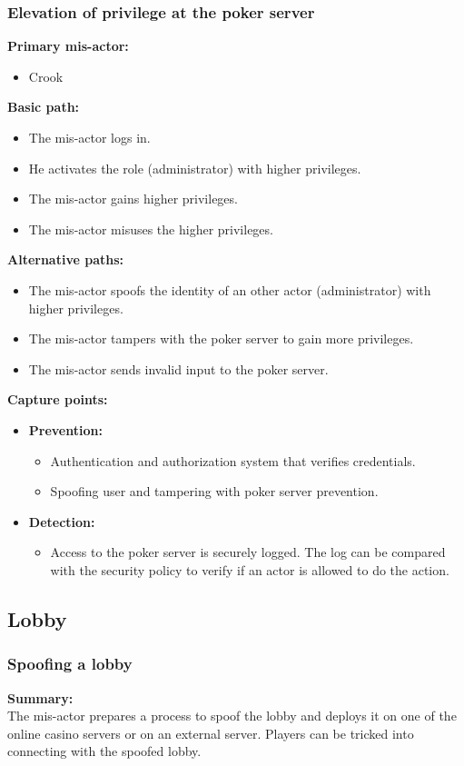 \documentclass[a4paper,11pt]{report}
\begin{document}
\subsubsection{Elevation of privilege at the poker server}
\label{PokerServerCasesE}
\textbf{Primary mis-actor:}
\begin{itemize}
\item Crook
\end{itemize}
\textbf{Basic path:}
\begin{itemize}
\item The mis-actor logs in.
\item He activates the role (administrator) with higher privileges.
\item The mis-actor gains higher privileges.
\item The mis-actor misuses the higher privileges.
\end{itemize}
\textbf{Alternative paths:}
\begin{itemize}
\item The mis-actor spoofs the identity of an other actor (administrator) with higher privileges.
\item The mis-actor tampers with the poker server to gain more privileges.
\item The mis-actor sends invalid input to the poker server.
\end{itemize}
\textbf{Capture points:}
\begin{itemize}
\item \textbf{Prevention:}
\begin{itemize}
\item Authentication and authorization system that verifies credentials.
\item Spoofing user and tampering with poker server prevention.
\end{itemize}
\item \textbf{Detection:}
\begin{itemize}
\item Access to the poker server is securely logged. The log can be compared with the security policy to verify if an actor is allowed to do the action.
\end{itemize}
\end{itemize}

\subsection{Lobby}
\label{LobbyCases}
\subsubsection{Spoofing a lobby}
\label{LobbyCasesS}
\textbf{Summary:} \\
The mis-actor prepares a process to spoof the lobby and deploys it on one of the online casino servers or on an external server. Players can be tricked into connecting with the spoofed lobby.
\end{document}
